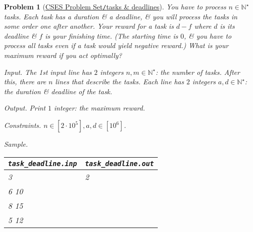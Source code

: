\documentclass{article}
\newtheorem{problem}{Problem}
\begin{document}
\begin{problem}[\href{https://cses.fi/problemset/task/1630}{CSES Problem Set{\tt/}tasks \& deadlines}]
    You have to process $n\in\mathbb{N}^\star$ tasks. Each task has a duration \& a deadline, \& you will process the tasks in some order one after another. Your reward for a task is $d - f$ where $d$ is its deadline \& $f$ is your finishing time. (The starting time is $0$, \& you have to process all tasks even if a task would yield negative reward.) What is your maximum reward if you act optimally?
    \item {\sf Input.} The 1st input line has $2$ integers $n,m\in\mathbb{N}^\star$: the number of tasks. After this, there are $n$ lines that describe the tasks. Each line has $2$ integers $a,d\in\mathbb{N}^\star$: the duration \& deadline of the task.
    \item {\sf Output.} Print $1$ integer: the maximum reward.
    \item {\sf Constraints.} $n\in[2\cdot10^5],a,d\in[10^6]$.
    \item {\sf Sample.}
    \begin{table}[H]
        \centering
        \begin{tabular}{|l|l|}
            \hline
            \verb|task_deadline.inp| & \verb|task_deadline.out| \\
            \hline
            3 & 2 \\
            6 10 & \\
            8 15 & \\
            5 12 & \\
            \hline
        \end{tabular}
    \end{table}
\end{problem}
\end{document}
